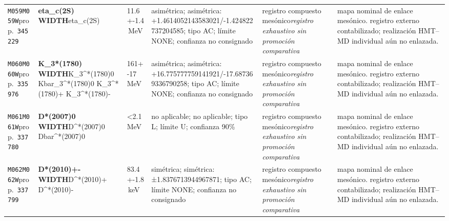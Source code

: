 \begin{landscape}
\begin{longtable}{L{1.85cm}L{4.45cm}L{2.35cm}L{4.05cm}L{3.35cm}L{7.15cm}}
\texttt{M059}\newline \texttt{M059W}\newline prop.\ \texttt{345229} & \textbf{eta\_\allowbreak{}c(2S) WIDTH}\newline eta\_\allowbreak{}c(2S) & 11.6+-1.4\,MeV & asimétrica; asimétrica: +1.4614052143583021/-1.424822737204585; tipo AC; límite NONE; confianza no consignado & registro compuesto mesónico\newline \emph{registro exhaustivo sin promoción comparativa} & mapa nominal de enlace mesónico. registro externo contabilizado; realización HMT--MD individual aún no enlazada. \\
\texttt{M060}\newline \texttt{M060W}\newline prop.\ \texttt{335976} & \textbf{K\_\allowbreak{}3*(1780) WIDTH}\newline K\_\allowbreak{}3\textasciicircum{}*(1780)0 \textbar{}\allowbreak{} Kbar\_\allowbreak{}3\textasciicircum{}*(1780)0 \textbar{}\allowbreak{} K\_\allowbreak{}3\textasciicircum{}*(1780)+ \textbar{}\allowbreak{} K\_\allowbreak{}3\textasciicircum{}*(1780)- & 161+-17\,MeV & asimétrica; asimétrica: +16.775777759141921/-17.687369336790258; tipo AC; límite NONE; confianza no consignado & registro compuesto mesónico\newline \emph{registro exhaustivo sin promoción comparativa} & mapa nominal de enlace mesónico. registro externo contabilizado; realización HMT--MD individual aún no enlazada. \\
\texttt{M061}\newline \texttt{M061W}\newline prop.\ \texttt{337780} & \textbf{D*(2007)0 WIDTH}\newline D\textasciicircum{}*(2007)0 \textbar{}\allowbreak{} Dbar\textasciicircum{}*(2007)0 & \textless{}2.1\,MeV & no aplicable; no aplicable; tipo L; límite U; confianza 90\% & registro compuesto mesónico\newline \emph{registro exhaustivo sin promoción comparativa} & mapa nominal de enlace mesónico. registro externo contabilizado; realización HMT--MD individual aún no enlazada. \\
\texttt{M062}\newline \texttt{M062W}\newline prop.\ \texttt{337799} & \textbf{D*(2010)+- WIDTH}\newline D\textasciicircum{}*(2010)+ \textbar{}\allowbreak{} D\textasciicircum{}*(2010)- & 83.4+-1.8\,keV & simétrica; simétrica: ±1.8376713944967871; tipo AC; límite NONE; confianza no consignado & registro compuesto mesónico\newline \emph{registro exhaustivo sin promoción comparativa} & mapa nominal de enlace mesónico. registro externo contabilizado; realización HMT--MD individual aún no enlazada. \\

\end{longtable}
\end{landscape}
